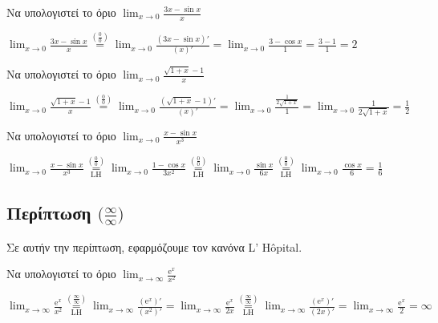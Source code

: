 \begin{example}
  Να υπολογιστεί το όριο $ \lim_{x \to 0} \frac{3x- \sin{x}}{x} $
\end{example}
\begin{solution}
  $ \lim_{x \to 0} \frac{3x- \sin{x}}{x} \overset{(\frac{0}{0})}{=} \lim_{x \to 0}
  \frac{(3x- \sin{x} )'}{(x)'} = \lim_{x \to 0} \frac{3- \cos{x}}{1} = \frac{3- 1}{1}
  = 2 $
\end{solution}

\begin{example}
  Να υπολογιστεί το όριο $ \lim_{x \to 0} \frac{\sqrt{1+x} -1}{x} $
\end{example}
\begin{solution}
  $ \lim_{x \to 0} \frac{\sqrt{1+x} -1}{x} \overset{(\frac{0}{0})}{=} \lim_{x \to 0}
  \frac{(\sqrt{1+x} -1)'}{(x)'} = \lim_{x \to 0} \frac{\frac{1}{2 \sqrt{1+x}}}{1} = 
  \lim_{x \to 0} \frac{1}{2 \sqrt{1+x}} = \frac{1}{2} $
\end{solution}

\begin{example}
  Να υπολογιστεί το όριο $ \lim_{x \to 0} \frac{x- \sin{x}}{x^{3}} $
\end{example}
\begin{solution} 
  $\lim_{x \to 0} \frac{x - \sin{x}}{x^{3}}
  \overset{\left(\frac{0}{0}\right)}{\underset{\mathrm{LH}}{=}} 
  \lim_{x \to 0} \frac{1 - \cos{x}}{3x^{2}}
  \overset{\left(\frac{0}{0}\right)}{\underset{\mathrm{LH}}{=}} 
  \lim_{x \to 0} \frac{\sin{x}}{6x} 
  \overset{\left(\frac{0}{0}\right)}{\underset{\mathrm{LH}}{=}} 
  \lim_{x \to 0} \frac{\cos{x}}{6} = \frac{1}{6}$ 
\end{solution}


\subsection*{Περίπτωση $ \bigl(\frac{\infty}{\infty}\bigr) $}

Σε αυτήν την περίπτωση, εφαρμόζουμε τον κανόνα L' H\^{o}pital.

\begin{example}
  Να υπολογιστεί το όριο $ \lim_{x \to \infty} \frac{\mathrm{e}^{x}}{x^{2}} $
\end{example}
\begin{solution}
  $ \lim_{x \to \infty} \frac{\mathrm{e}^{x}}{x^{2}}
  \overset{\left(\frac{\infty}{\infty}\right)}{\underset{\mathrm{LH}}{=}} \lim_{x \to
  \infty} \frac{(\mathrm{e}^{x} )'}{(x^{2})'} = \lim_{x \to \infty}
  \frac{\mathrm{e}^{x}}{2x}
  \overset{\left(\frac{\infty}{\infty}\right)}{\underset{\mathrm{LH}}{=}} 
  \lim_{x \to \infty} \frac{(\mathrm{e}^{x})'}{(2x)'} = \lim_{x \to \infty}
  \frac{\mathrm{e}^{x}}{2} = \infty
  $ 
\end{solution}

